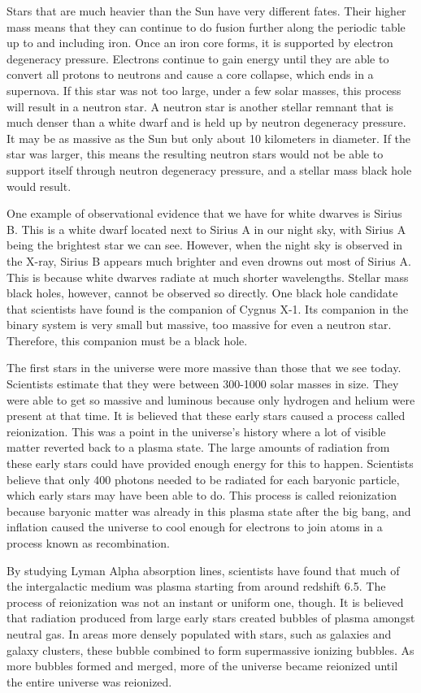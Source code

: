 \documentclass[12pt]{article}
\begin{document}
Stars that are much heavier than the Sun have very different fates.  Their
higher mass means that they can continue to do fusion further along the periodic
table up to and including iron.  Once an iron core forms, it is supported by
electron degeneracy pressure.  Electrons continue to gain energy until they are
able to convert all protons to neutrons and cause a core collapse, which ends in
a supernova.  If this star was not too large, under a few solar masses, this
process will result in a neutron star.  A neutron star is another stellar
remnant that is much denser than a white dwarf and is held up by neutron
degeneracy pressure.  It may be as massive as the Sun but only about 10
kilometers in diameter.  If the star was larger, this means the resulting
neutron stars would not be able to support itself through neutron degeneracy
pressure, and a stellar mass black hole would result.

One example of observational evidence that we have for white dwarves is Sirius
B.  This is a white dwarf located next to Sirius A in our night sky, with Sirius
A being the brightest star we can see.  However, when the night sky is observed
in the X-ray, Sirius B appears much brighter and even drowns out most of Sirius
A.  This is because white dwarves radiate at much shorter wavelengths.  Stellar
mass black holes, however, cannot be observed so directly.  One black hole
candidate that scientists have found is the companion of Cygnus X-1.  Its
companion in the binary system is very small but massive, too massive for even a
neutron star.  Therefore, this companion must be a black hole.

The first stars in the universe were more massive than those that we see today.
Scientists estimate that they were between 300-1000 solar masses in size.  They
were able to get so massive and luminous because only hydrogen and helium were
present at that time.  It is believed that these early stars caused a process
called reionization.  This was a point in the universe's history where a lot of
visible matter reverted back to a plasma state.  The large amounts of radiation
from these early stars could have provided enough energy for this to happen.
Scientists believe that only 400 photons needed to be radiated for each baryonic
particle, which early stars may have been able to do.  This process is called
reionization because baryonic matter was already in this plasma state after the
big bang, and inflation caused the universe to cool enough for electrons to join
atoms in a process known as recombination.

By studying Lyman Alpha absorption lines, scientists have found that much of the
intergalactic medium was plasma starting from around redshift 6.5.  The process
of reionization was not an instant or uniform one, though.  It is believed that
radiation produced from large early stars created bubbles of plasma amongst
neutral gas.  In areas more densely populated with stars, such as galaxies and
galaxy clusters, these bubble combined to form supermassive ionizing bubbles.
As more bubbles formed and merged, more of the universe became reionized until
the entire universe was reionized.
\end{document}
